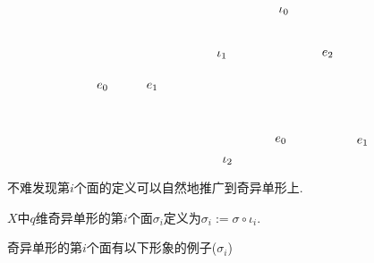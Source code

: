 \documentclass{article}
\begin{document}
\begin{example}
\[\begin{tikzpicture}[x=0.75pt,y=0.75pt,yscale=-1,xscale=1]
            \draw (144,166.4) node [anchor=north west][inner sep=0.75pt]    {$e_{0}$};
            \draw (197,166.4) node [anchor=north west][inner sep=0.75pt]    {$e_{1}$};
            \draw (334,223.4) node [anchor=north west][inner sep=0.75pt]    {$e_{0}$};
            \draw (421.11,225.07) node [anchor=north west][inner sep=0.75pt]    {$e_{1}$};
            \draw (384,131.4) node [anchor=north west][inner sep=0.75pt]    {$e_{2}$};
            \draw (278,245.4) node [anchor=north west][inner sep=0.75pt]    {$\iota _{2}$};
            \draw (272,132.4) node [anchor=north west][inner sep=0.75pt]    {$\iota _{1}$};
            \draw (338,85.4) node [anchor=north west][inner sep=0.75pt]    {$\iota _{0}$};
            
            
            \end{tikzpicture}\]
\end{example}
不难发现第$i$个面的定义可以自然地推广到奇异单形上.
\begin{definition}
    $X$中$q$维奇异单形的第$i$个面$\sigma_i$定义为$\sigma_i := \sigma \circ \iota_i$.
\end{definition}
奇异单形的第$i$个面有以下形象的例子($\sigma_i$)
\end{document}
